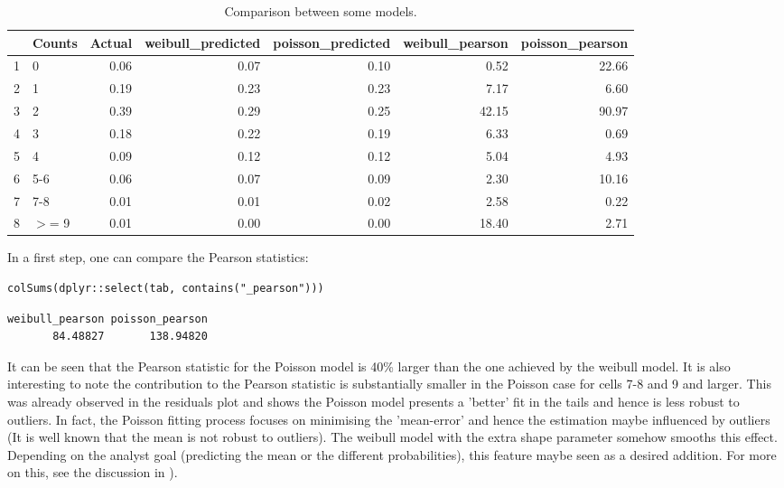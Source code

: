\documentclass[a4paper,twoside,11pt]{article}
\begin{document}
\begin{table}[ht]
\centering
\begin{tabular}{rlrrrrr}
  \hline
 & Counts & Actual & weibull\_predicted & poisson\_predicted & weibull\_pearson & poisson\_pearson \\ 
  \hline
1 & 0 & 0.06 & 0.07 & 0.10 & 0.52 & 22.66 \\ 
  2 & 1 & 0.19 & 0.23 & 0.23 & 7.17 & 6.60 \\ 
  3 & 2 & 0.39 & 0.29 & 0.25 & 42.15 & 90.97 \\ 
  4 & 3 & 0.18 & 0.22 & 0.19 & 6.33 & 0.69 \\ 
  5 & 4 & 0.09 & 0.12 & 0.12 & 5.04 & 4.93 \\ 
  6 & 5-6 & 0.06 & 0.07 & 0.09 & 2.30 & 10.16 \\ 
  7 & 7-8 & 0.01 & 0.01 & 0.02 & 2.58 & 0.22 \\ 
  8 & $>$= 9 & 0.01 & 0.00 & 0.00 & 18.40 & 2.71 \\ 
   \hline
\end{tabular}
\caption{Comparison between some models.} 
\end{table}



In a first step, one can compare the Pearson statistics:
\begin{verbatim}
colSums(dplyr::select(tab, contains("_pearson")))
\end{verbatim}

\begin{verbatim}
weibull_pearson poisson_pearson 
       84.48827       138.94820
\end{verbatim}


It can be seen that the Pearson statistic for the Poisson model is 40\% larger
than the one achieved by the weibull model. It is also interesting to note the
contribution to the Pearson statistic is substantially smaller in the Poisson
case for cells 7-8 and 9 and larger. This was already observed in the residuals
plot and shows the Poisson model presents a 'better' fit in the tails and hence
is less robust to outliers. In fact, the Poisson fitting process focuses on
minimising the 'mean-error' and hence the estimation maybe influenced by
outliers (It is well known that the mean is not robust to outliers). The weibull
model with the extra shape parameter somehow smooths this effect. Depending on
the analyst goal (predicting the mean or the different probabilities), this
feature maybe seen as a desired addition. For more on this, see the discussion
in \citet[Section 6.2]{cameron2013regression}).
\end{document}
